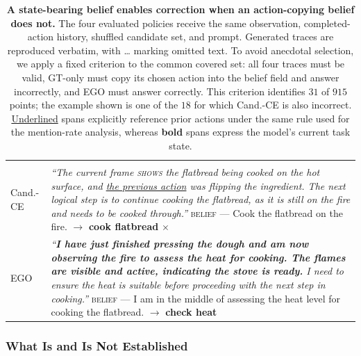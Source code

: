 \documentclass[letterpaper]{article}
\newcommand{\obs}[1]{\textcolor{measuredblue}{#1}}
\newcommand{\method}{\textsc{EGO}}
\newcommand{\cmark}{\checkmark}
\begin{document}
\begin{table}[t]
\begin{tabular}{@{}p{}p{}@{}}
    \quad{\scriptsize[scene description via ``shows'']} \\
Cand.-CE
  & \emph{``The current frame \textsc{shows} the flatbread being cooked on the
    hot surface, and \underline{the previous action} was flipping the
    ingredient. The next logical step is to continue cooking the flatbread, as
    it is still on the fire and needs to be cooked through.''}
    \newline
    \textsc{belief} --- Cook the flatbread on the fire.
    \newline
    $\rightarrow$ \textbf{cook flatbread} $\times$
    \quad{\scriptsize[scene description via ``shows'']} \\
\method{}
  & \emph{``\textbf{I have just finished pressing the dough and am now
    observing the fire to assess the heat for cooking. The flames are visible
    and active, indicating the stove is ready.} I need to ensure the heat is
    suitable before proceeding with the next step in cooking.''}
    \newline
    \textsc{belief} --- I am in the middle of assessing the heat level for
    cooking the flatbread.
    \newline
    $\rightarrow$ \textbf{check heat} \cmark
    \quad{\scriptsize[state-bearing belief; no explicit prior-action reference]} \\
\bottomrule
\end{tabular}
\caption{\textbf{A state-bearing belief enables correction when an
action-copying belief does not.}  The four evaluated policies receive the
same observation, completed-action history, shuffled candidate set, and
prompt.  Generated traces are reproduced verbatim, with \ldots{} marking
omitted text.  To avoid anecdotal selection, we apply a fixed criterion to the
common covered set: all four traces must be valid, GT-only must copy its chosen
action into the belief field and answer incorrectly, and \method{} must answer
correctly.  This criterion identifies \obs{$31$} of \obs{$915$} points; the
example shown is one of the \obs{$18$} for which Cand.-CE is also incorrect.
\underline{Underlined} spans explicitly reference prior actions under the
same rule used for the mention-rate analysis, whereas \textbf{bold} spans
express the model's current task state.}
\label{tab:trace-echo}
\end{table}

\subsubsection{What Is and Is Not Established}
\label{sec:er-scope}
\end{document}
